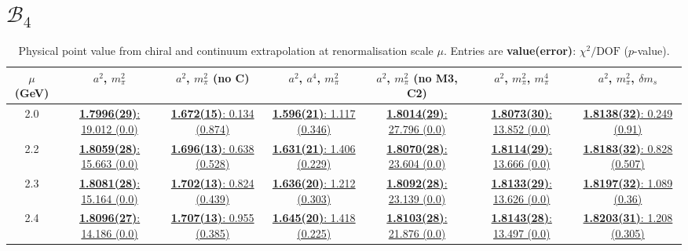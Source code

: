 \documentclass[12pt]{extarticle}
\begin{document}
\section{$\mathcal{B}_4$}
\begin{table}[h!]
\begin{center}
\begin{tabular}{|c|c|c|c|c|c|c|}
\hline
$\mu$ (GeV) & $a^2$, $m_\pi^2$& $a^2$, $m_\pi^2$ (no C)& $a^2$, $a^4$, $m_\pi^2$& $a^2$, $m_\pi^2$ (no M3, C2)& $a^2$, $m_\pi^2$, $m_\pi^4$& $a^2$, $m_\pi^2$, $\delta m_s$\\
\hline
2.0& \hyperlink{SSpPP/SUSY/a2m2_20.pdf.1}{\textbf{1.7996(29)}: 19.012 (0.0)} & \hyperlink{SSpPP/SUSY/a2m2noC_20.pdf.1}{\textbf{1.672(15)}: 0.134 (0.874)} & \hyperlink{SSpPP/SUSY/a2a4m2_20.pdf.1}{\textbf{1.596(21)}: 1.117 (0.346)} & \hyperlink{SSpPP/SUSY/a2m2mcut_20.pdf.1}{\textbf{1.8014(29)}: 27.796 (0.0)} & \hyperlink{SSpPP/SUSY/a2m2m4_20.pdf.1}{\textbf{1.8073(30)}: 13.852 (0.0)} & \hyperlink{SSpPP/SUSY/a2m2delm_20.pdf.1}{\textbf{1.8138(32)}: 0.249 (0.91)}\\
2.2& \hyperlink{SSpPP/SUSY/a2m2_22.pdf.1}{\textbf{1.8059(28)}: 15.663 (0.0)} & \hyperlink{SSpPP/SUSY/a2m2noC_22.pdf.1}{\textbf{1.696(13)}: 0.638 (0.528)} & \hyperlink{SSpPP/SUSY/a2a4m2_22.pdf.1}{\textbf{1.631(21)}: 1.406 (0.229)} & \hyperlink{SSpPP/SUSY/a2m2mcut_22.pdf.1}{\textbf{1.8070(28)}: 23.604 (0.0)} & \hyperlink{SSpPP/SUSY/a2m2m4_22.pdf.1}{\textbf{1.8114(29)}: 13.666 (0.0)} & \hyperlink{SSpPP/SUSY/a2m2delm_22.pdf.1}{\textbf{1.8183(32)}: 0.828 (0.507)}\\
2.3& \hyperlink{SSpPP/SUSY/a2m2_23.pdf.1}{\textbf{1.8081(28)}: 15.164 (0.0)} & \hyperlink{SSpPP/SUSY/a2m2noC_23.pdf.1}{\textbf{1.702(13)}: 0.824 (0.439)} & \hyperlink{SSpPP/SUSY/a2a4m2_23.pdf.1}{\textbf{1.636(20)}: 1.212 (0.303)} & \hyperlink{SSpPP/SUSY/a2m2mcut_23.pdf.1}{\textbf{1.8092(28)}: 23.139 (0.0)} & \hyperlink{SSpPP/SUSY/a2m2m4_23.pdf.1}{\textbf{1.8133(29)}: 13.626 (0.0)} & \hyperlink{SSpPP/SUSY/a2m2delm_23.pdf.1}{\textbf{1.8197(32)}: 1.089 (0.36)}\\
2.4& \hyperlink{SSpPP/SUSY/a2m2_24.pdf.1}{\textbf{1.8096(27)}: 14.186 (0.0)} & \hyperlink{SSpPP/SUSY/a2m2noC_24.pdf.1}{\textbf{1.707(13)}: 0.955 (0.385)} & \hyperlink{SSpPP/SUSY/a2a4m2_24.pdf.1}{\textbf{1.645(20)}: 1.418 (0.225)} & \hyperlink{SSpPP/SUSY/a2m2mcut_24.pdf.1}{\textbf{1.8103(28)}: 21.876 (0.0)} & \hyperlink{SSpPP/SUSY/a2m2m4_24.pdf.1}{\textbf{1.8143(28)}: 13.497 (0.0)} & \hyperlink{SSpPP/SUSY/a2m2delm_24.pdf.1}{\textbf{1.8203(31)}: 1.208 (0.305)}\\
\hline
\end{tabular}
\caption{Physical point value from chiral and continuum extrapolation at renormalisation scale $\mu$. Entries are \textbf{value(error)}: $\chi^2/\text{DOF}$ ($p$-value).}
\end{center}
\end{table}
\end{document}
